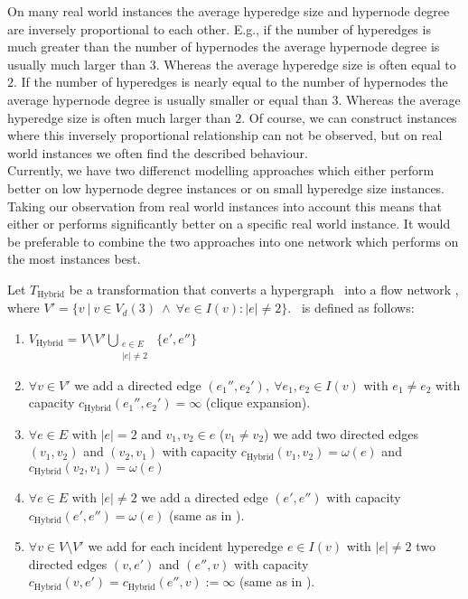 On many real world instances the average hyperedge size and hypernode degree are inversely
proportional to each other. E.g., if the number of hyperedges is much greater than the
number of hypernodes the average hypernode degree is usually much larger than $3$. Whereas
the average hyperedge size is often equal to $2$. If the number of hyperedges is nearly equal
to the number of hypernodes the average hypernode degree is usually smaller or equal than $3$. Whereas
the average hyperedge size is often much larger than $2$. Of course, we can construct instances
where this inversely proportional relationship can not be observed, but on real world instances
we often find the described behaviour. \\
Currently, we have two differenct modelling approaches which either perform better on low hypernode degree
instances or on small hyperedge size instances. Taking our observation from real world instances 
into account this means that either  or  performs significantly better on
a specific real world instance. It would be preferable to combine the two approaches into one network 
which performs on the most instances best. \\

\begin{definition}
Let $T_{\text{Hybrid}}$ be a transformation that converts a hypergraph \HypergraphDef~into 
a flow network \Hybrid, where $V' = \{v\ |\ v \in V_d(3)\ 
\land\ \forall e \in I(v): |e| \neq 2\}$. \ShortHybrid~is defined as follows:
\begin{enumerate}
\item $V_{\text{Hybrid}} = V\setminus V' \bigcup\limits_{\substack{e \in E \\ |e| \neq 2}}\ \{e', e''\}$
\item $\forall v \in V'$ we add a directed edge $(e_1'', e_2'),\ \forall e_1, e_2 \in I(v)$ 
      with $e_1 \neq e_2$ with capacity $c_{\text{Hybrid}}(e_1'', e_2') = \infty$ (clique expansion).
\item $\forall e \in E$ with $|e| = 2$ and $v_1,v_2 \in e$ ($v_1 \neq v_2$) we add 
      two directed edges $(v_1,v_2)$ and $(v_2,v_1)$ with capacity $c_{\text{Hybrid}}(v_1,v_2) = \omega(e)$
      and $c_{\text{Hybrid}}(v_2,v_1) = \omega(e)$
\item $\forall e \in E$ with $|e| \neq 2$ we add a directed edge $(e',e'')$
      with capacity $c_{\text{Hybrid}}(e',e'') = \omega(e)$ (same as in ).
\item $\forall v \in V\setminus V'$ we add for each incident hyperedge $e \in I(v)$ with $|e| \neq 2$ 
      two directed edges $(v,e')$ and $(e'',v)$ with capacity 
      $c_{\text{Hybrid}}(v,e') = c_{\text{Hybrid}}(e'',v) := \infty$ (same as in ).
\end{enumerate} 
\end{definition}

